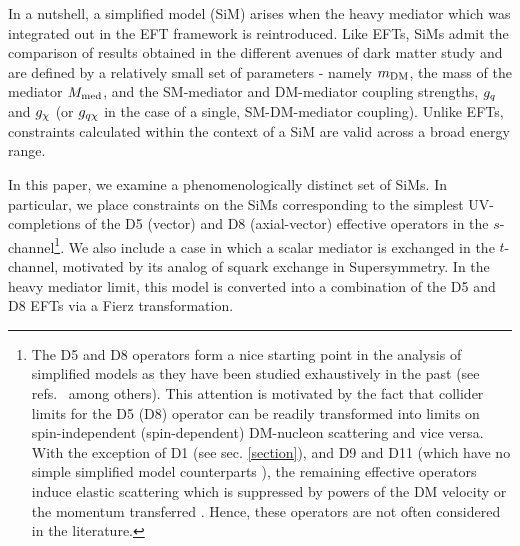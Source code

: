 In a nutshell, a simplified model (SiM) arises when the heavy mediator which was integrated out in the EFT framework is reintroduced. Like EFTs, SiMs admit the comparison of results obtained in the different avenues of dark matter study \cite{} and are defined by a relatively small set of parameters - namely $m_{\mathrm{DM}}$, the mass of the mediator $M_{\mathrm{med}}$, and the SM-mediator and DM-mediator coupling strengths, $g_q$ and $g_{\chi}$ (or $g_{q \chi}$ in the case of a single, SM-DM-mediator coupling). Unlike EFTs, constraints calculated within the context of a SiM are valid across a broad energy range.

In this paper, we examine a phenomenologically distinct set of SiMs. In particular, we place constraints on the SiMs corresponding to the simplest UV-completions of the D5 (vector) and D8 (axial-vector) effective operators in the $s$-channel\footnote{The D5 and D8 operators form a nice starting point in the analysis of simplified models as they have been studied exhaustively in the past (see refs.~\cite{Aad:1363019, ATLAS-CONF-2012-147, CMS-PAS-EXO-12-048, Buckley:2013jwa, Abdallah:1472683, MonoX, ValidEFT, ValidEFT_part2, ValidEFT_part3} among others). This attention is motivated by the fact that collider limits for the D5 (D8) operator can be readily transformed into limits on spin-independent (spin-dependent) DM-nucleon scattering and vice versa. With the exception of D1 (see sec. \ref{section}), and D9 and D11 (which have no simple simplified model counterparts \cite{}), the remaining effective operators induce elastic scattering which is suppressed by powers of the DM velocity or the momentum transferred \cite{Kumar}. Hence, these operators are not often considered in the literature.}. We also include a case in which a scalar mediator is exchanged in the $t$-channel, motivated by its analog of squark exchange in Supersymmetry. In the heavy mediator limit, this model is converted into a combination of the D5 and D8 EFTs via a Fierz transformation.

